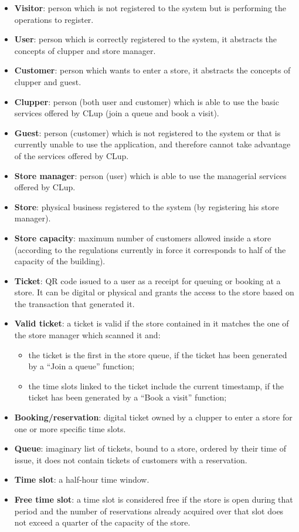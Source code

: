 \begin{itemize}
\item
  \textbf{Visitor}: person which is not registered to the system but is performing the operations to register.
\item
  \textbf{User}: person which is correctly registered to the system, it abstracts the concepts of clupper and store manager.
\item
  \textbf{Customer}: person which wants to enter a store, it abstracts the concepts of clupper and guest.
\item
  \textbf{Clupper}: person (both user and customer) which is able to use the basic services offered by CLup (join a queue and book a visit).
\item
  \textbf{Guest}: person (customer) which is not registered to the system or that is currently unable to use the application, and therefore cannot take advantage of the services offered by CLup.
\item
  \textbf{Store manager}: person (user) which is able to use the managerial services offered by CLup.
\item
  \textbf{Store}: physical business registered to the system (by registering his store manager).
\item
  \textbf{Store capacity}: maximum number of customers allowed inside a store (according to the regulations currently in force it corresponds to half of the capacity of the building).
\item
  \textbf{Ticket}: QR code issued to a user as a receipt for queuing or booking at a store. It can be digital or physical and grants the access to the store based on the transaction that generated it.
\item
  \textbf{Valid ticket}: a ticket is valid if the store contained in it matches the one of the store manager which scanned it and:
  \begin{itemize}
  \tightlist
  \item
    the ticket is the first in the store queue, if the ticket has been generated by a ``Join a queue'' function;
  \item
    the time slots linked to the ticket include the current timestamp, if the ticket has been generated by a ``Book a visit'' function;
  \end{itemize}
\item
  \textbf{Booking/reservation}: digital ticket owned by a clupper to enter a store for one or more specific time slots.
\item
  \textbf{Queue}: imaginary list of tickets, bound to a store, ordered by their time of issue, it does not contain tickets of customers with a reservation.
\item
  \textbf{Time slot}: a half-hour time window.
\item
  \textbf{Free time slot}: a time slot is considered free if the store is open during that period and the number of reservations already acquired over that slot does not exceed a quarter of the capacity of the store.
\end{itemize}


